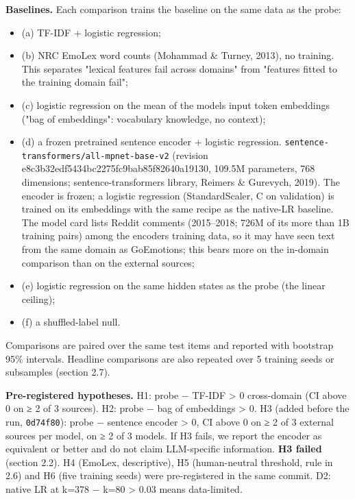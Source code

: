 \documentclass[
  10pt,
]{article}
\providecommand{\tightlist}{%
  \setlength{\itemsep}{0pt}\setlength{\parskip}{0pt}}
\begin{document}
\textbf{Baselines.} Each comparison trains the baseline on the same data
as the probe:

\begin{itemize}
\tightlist
\item
  (a) TF-IDF + logistic regression;
\item
  (b) NRC EmoLex word counts (Mohammad \& Turney, 2013), no training.
  This separates "lexical features fail across domains" from "features
  fitted to the training domain fail";
\item
  (c) logistic regression on the mean of the model\textquotesingle s
  input token embeddings ("bag of embeddings": vocabulary knowledge, no
  context);
\item
  (d) a frozen pretrained sentence encoder + logistic regression.
  \texttt{sentence-transformers/all-mpnet-base-v2} (revision
  e8c3b32edf5434bc2275fc9bab85f82640a19130, 109.5M parameters, 768
  dimensions; sentence-transformers library, Reimers \& Gurevych, 2019).
  The encoder is frozen; a logistic regression (StandardScaler, C on
  validation) is trained on its embeddings with the same recipe as the
  native-LR baseline. The model card lists Reddit comments (2015--2018;
  726M of its more than 1B training pairs) among the
  encoder\textquotesingle s training data, so it may have seen text from
  the same domain as GoEmotions; this bears more on the in-domain
  comparison than on the external sources;
\item
  (e) logistic regression on the same hidden states as the probe (the
  linear ceiling);
\item
  (f) a shuffled-label null.
\end{itemize}

Comparisons are paired over the same test items and reported with
bootstrap 95\% intervals. Headline comparisons are also repeated over 5
training seeds or subsamples (section 2.7).

\textbf{Pre-registered hypotheses.} H1: probe − TF-IDF \textgreater{} 0
cross-domain (CI above 0 on ≥ 2 of 3 sources). H2: probe − bag of
embeddings \textgreater{} 0. H3 (added before the run,
\texttt{0d74f80}): probe − sentence encoder \textgreater{} 0, CI above 0
on ≥ 2 of 3 external sources per model, on ≥ 2 of 3 models. If H3 fails,
we report the encoder as equivalent or better and do not claim
LLM-specific information. \textbf{H3 failed} (section 2.2). H4 (EmoLex,
descriptive), H5 (human-neutral threshold, rule in 2.6) and H6 (five
training seeds) were pre-registered in the same commit. D2: native LR at
k=378 − k=80 \textgreater{} 0.03 means data-limited.
\end{document}
